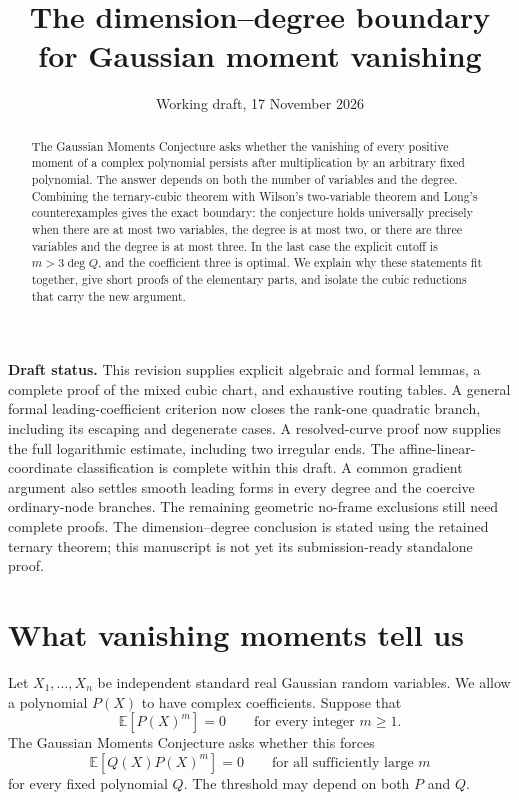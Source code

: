 \documentclass[11pt]{article}
\title{The dimension--degree boundary\\for Gaussian moment vanishing}
\author{}
\date{Working draft, 17 November 2026}
\theoremstyle{definition}\newtheorem{definition}[theorem]{Definition}
\theoremstyle{remark}\newtheorem{remark}[theorem]{Remark}
\newcommand{\E}{\mathbb E}
\begin{document}
\maketitle
\begin{center}\begin{minipage}{0.91\textwidth}\small
\textbf{Draft status.} This revision supplies explicit algebraic and formal
lemmas, a complete proof of the mixed cubic chart, and exhaustive routing
tables. A general formal leading-coefficient criterion now closes the
rank-one quadratic branch, including its escaping and degenerate cases.
A resolved-curve proof now supplies the full logarithmic estimate,
including two irregular ends. The affine-linear-coordinate classification
is complete within this draft. A common gradient argument also settles
smooth leading forms in every degree and the coercive ordinary-node
branches. The remaining geometric no-frame exclusions still need
complete proofs. The
dimension--degree conclusion is stated using the retained ternary theorem;
this manuscript is not yet its submission-ready standalone proof.
\end{minipage}\end{center}

\begin{abstract}
The Gaussian Moments Conjecture asks whether the vanishing of every
positive moment of a complex polynomial persists after multiplication by
an arbitrary fixed polynomial. The answer depends on both the number of
variables and the degree. Combining the ternary-cubic theorem with
Wilson's two-variable theorem and Long's counterexamples gives the exact
boundary: the conjecture holds universally precisely when there are at
most two variables, the degree is at most two, or there are three variables
and the degree is at most three. In the last case the explicit cutoff is
$m>3\deg Q$, and the coefficient three is optimal. We explain why these
statements fit together, give short proofs of the elementary parts, and
isolate the cubic reductions that carry the new argument.
\end{abstract}

\section{What vanishing moments tell us}

Let $X_1,\ldots,X_n$ be independent standard real Gaussian random
variables. We allow a polynomial $P(X)$ to have complex coefficients.
Suppose that
\begin{equation}\label{eq:pure}
  \E[P(X)^m]=0\qquad\text{for every integer }m\geq1.
\end{equation}
The Gaussian Moments Conjecture asks whether this forces
\begin{equation}\label{eq:safe}
  \E[Q(X)P(X)^m]=0\qquad\text{for all sufficiently large }m
\end{equation}
for every fixed polynomial $Q$. The threshold may depend on both $P$
and $Q$.
\end{document}
